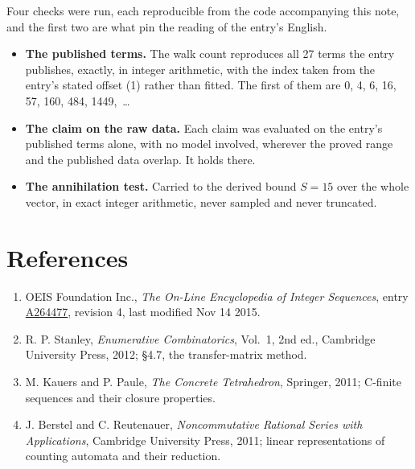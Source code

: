 \documentclass[11pt]{article}
\theoremstyle{definition}
\begin{document}
Four checks were run, each reproducible from the code accompanying this note, and the first two are what pin the reading of the entry's English.

\begin{itemize}

\item {\bfseries The published terms.} The walk count reproduces all 27 terms the entry publishes, exactly, in integer arithmetic, with the index taken from the entry's stated offset (1) rather than fitted. The first of them are 0, 4, 6, 16, 57, 160, 484, 1449,~\dots

\item {\bfseries The claim on the raw data.} Each claim was evaluated on the entry's published terms alone, with no model involved, wherever the proved range and the published data overlap. It holds there.

\item {\bfseries The annihilation test.} Carried to the derived bound $S = 15$ over the whole vector, in exact integer arithmetic, never sampled and never truncated.

\end{itemize}

\section{References}

\begin{enumerate}

\item OEIS Foundation Inc., \emph{The On-Line Encyclopedia of Integer Sequences}, entry \href{https://oeis.org/A264477}{A264477}, revision 4, last modified Nov 14 2015.

\item R. P. Stanley, \emph{Enumerative Combinatorics}, Vol.~1, 2nd ed., Cambridge University Press, 2012; \S4.7, the transfer-matrix method.

\item M. Kauers and P. Paule, \emph{The Concrete Tetrahedron}, Springer, 2011; C-finite sequences and their closure properties.

\item J. Berstel and C. Reutenauer, \emph{Noncommutative Rational Series with Applications}, Cambridge University Press, 2011; linear representations of counting automata and their reduction.

\end{enumerate}
\end{document}
